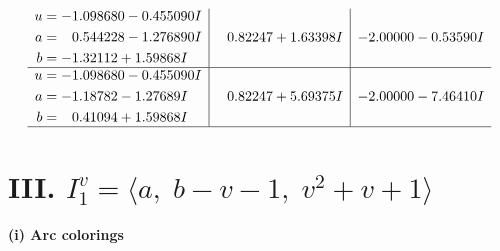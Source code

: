 \documentclass[1p]{elsarticle_modified}
\theoremstyle{definition}
\begin{document}
$$\begin{array}{c|c|c}
\begin{aligned}
u &= -1.098680 - 0.455090 I \\
a &= \phantom{-}0.544228 - 1.276890 I \\
b &= -1.32112 + 1.59868 I\end{aligned}
 & \phantom{-}0.82247 + 1.63398 I & -2.00000 - 0.53590 I \\ \hline\begin{aligned}
u &= -1.098680 - 0.455090 I \\
a &= -1.18782 - 1.27689 I \\
b &= \phantom{-}0.41094 + 1.59868 I\end{aligned}
 & \phantom{-}0.82247 + 5.69375 I & -2.00000 - 7.46410 I\\
 \hline 
 \end{array}$$\newpage\newpage\renewcommand{\arraystretch}{1}
\centering \section*{III. $I^v_{1}= \langle a,\;b- v-1,\;v^2+v+1 \rangle$}
\flushleft \textbf{(i) Arc colorings}\\
\end{document}
